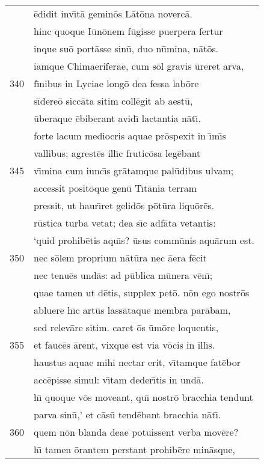 \documentclass[paper=6in:9in,pagesize=pdftex,
               headinclude=on,footinclude=on,12pt]{scrbook}
\begin{document}
\begin{longtable}[p]{ r l }
 & \=edidit inv\={\i}t\=a gemin\=os L\=at\=ona noverc\=a.\\ 
 & hinc quoque I\=un\=onem f\=ugisse puerpera fertur\\ 
 & inque su\=o port\=asse sin\=u, duo n\=umina, n\=at\=os.\\ 
 & iamque Chimaeriferae, cum s\=ol gravis \=ureret arva,\\ 
340 & f\={\i}nibus in Lyciae long\=o dea fessa lab\=ore\\ 
 & s\={\i}dere\=o sicc\=ata sitim coll\=egit ab aest\=u,\\ 
 & \=uberaque \=ebiberant avid\={\i} lactantia n\=at\={\i}.\\ 
 & forte lacum mediocris aquae pr\=ospexit in \={\i}m\={\i}s\\ 
 & vallibus; agrest\=es ill\={\i}c frutic\=osa leg\=ebant\\ 
345 & v\={\i}mina cum iunc\={\i}s gr\=atamque pal\=udibus ulvam;\\ 
 & accessit posit\=oque gen\=u T\={\i}t\=ania terram\\ 
 & pressit, ut haur\={\i}ret gelid\=os p\=ot\=ura liqu\=or\=es.\\ 
 & r\=ustica turba vetat; dea s\={\i}c adf\=ata vetantis:\\ 
 & `quid prohib\=etis aqu\={\i}s? \=usus comm\=unis aqu\=arum est.\\ 
350 & nec s\=olem proprium n\=at\=ura nec \=aera f\=ecit\\ 
 & nec tenu\=es und\=as: ad p\=ublica m\=unera v\=en\={\i};\\ 
 & quae tamen ut d\=etis, supplex pet\=o. n\=on ego nostr\=os\\ 
 & abluere h\={\i}c art\=us lass\=ataque membra par\=abam,\\ 
 & sed relev\=are sitim. caret \=os \=um\=ore loquentis,\\ 
355 & et fauc\=es \=arent, vixque est via v\=ocis in ill\={\i}s.\\ 
 & haustus aquae mihi nectar erit, v\={\i}tamque fat\=ebor\\ 
 & acc\=episse simul: v\={\i}tam deder\={\i}tis in und\=a.\\ 
 & h\={\i} quoque v\=os moveant, qu\={\i} nostr\=o bracchia tendunt\\ 
 & parva sin\=u,' et c\=as\=u tend\=ebant bracchia n\=at\={\i}.\\ 
360 & quem n\=on blanda deae potuissent verba mov\=ere?\\ 
 & h\={\i} tamen \=orantem perstant prohib\=ere min\=asque,\\ 

\end{longtable}
\end{document}
